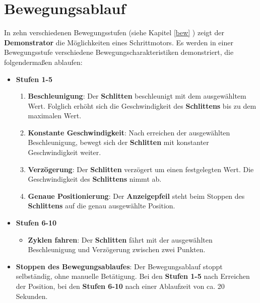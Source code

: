 
\chapter{Bewegungsablauf}

In zehn verschiedenen Bewegungsstufen (siehe Kapitel \ref{bew} ) zeigt der \textbf{Demonstrator} die Möglichkeiten eines Schrittmotors. Es werden in einer Bewegungsstufe verschiedene Bewegungscharakteristiken demonstriert, die folgendermaßen ablaufen:  

\begin{itemize}
	\item \textbf{Stufen 1-5}
	\begin{enumerate}
		\item\textbf{Beschleunigung}: Der \textbf{Schlitten} beschleunigt mit dem ausgewähltem Wert. Folglich erhöht sich die Geschwindigkeit des \textbf{Schlittens} bis zu dem maximalen Wert. 
		\item\textbf{Konstante Geschwindigkeit}: Nach erreichen der ausgewählten Beschleunigung, bewegt sich der \textbf{Schlitten} mit konstanter Geschwindigkeit weiter.
		\item\textbf{Verzögerung}: Der \textbf{Schlitten} verzögert um einen festgelegten Wert. Die Geschwindigkeit des \textbf{Schlittens} nimmt ab.
		\item\textbf{Genaue Positionierung}: Der \textbf{Anzeigepfeil} steht beim Stoppen des \textbf{Schlittens} auf die genau ausgewählte Position.
	\end{enumerate}
\end{itemize}
\begin{itemize}	
	\item \textbf{Stufen 6-10}
	\begin{itemize}
		\item\textbf{Zyklen fahren}: Der \textbf{Schlitten} fährt mit der ausgewählten Beschleunigung und Verzögerung zwischen zwei Punkten.
	\end{itemize}			
\item \textbf{Stoppen des Bewegungsablaufes}: Der Bewegungsablauf stoppt selbständig, ohne manuelle Betätigung. Bei den \textbf{Stufen 1-5} nach Erreichen der Position, bei den \textbf{ Stufen 6-10} nach einer Ablaufzeit von ca. 20 Sekunden.
\end{itemize}
